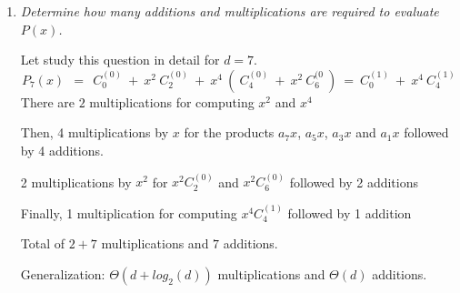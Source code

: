 \begin{itemize}
\begin{enumerate}
\item
{\em Determine how many additions and multiplications are required to evaluate $P(x)$.}

Let study this question in detail for $d=7$.
\[
P_7(x) \ \ = \ \ C_{0}^{(0)} \ + \ x^2 \ C_2^{(0)} \ + 
\ x^4 \ ( \ C_4^{(0)} \ + \ x^2 \ C_6^{(0} \ )
\ = \ C_0^{(1)} \ + \ x^4 \ C_4^{(1)} 
\]
There are $2$ multiplications for computing $x^2$ and $x^4$

Then, 4 multiplications by $x$ for the products $a_7 x$,  $a_5 x$, $a_3 x$ and $a_1 x$
followed by 4 additions.

2 multiplications by $x^2$ for $x^2 C_2^{(0)}$ and $x^2 C_6^{(0)}$
followed by 2 additions

Finally, 1 multiplication for computing $x^4 C_4^{(1)}$
followed by 1 addition
\medskip

Total of $2 + 7$ multiplications and $7$ additions.
\medskip

Generalization: 
$\Theta(d + log_2(d))$ multiplications and $\Theta(d)$ additions.
\end{enumerate}
\end{itemize}


